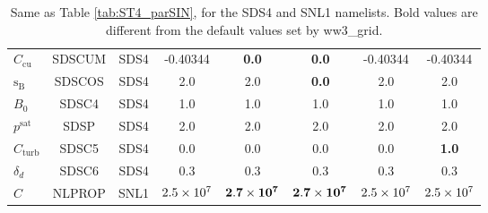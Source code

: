 \begin{landscape}
\begin{table}
\begin{center}
\begin{tabular}{|l|c|c|c|c|c|c|c|}
  $C_{\mathrm{cu}}$                & SDSCUM        & SDS4      & -0.40344    & \textbf{0.0}              & \textbf{0.0}     &-0.40344      &-0.40344   \\
  ${\mathrm{s_B}}$                 & SDSCOS        &SDS4       & 2.0         &  2.0                      & \textbf{0.0}     & 2.0          & 2.0 \\
   $B_0$                           & SDSC4         & SDS4      & 1.0         & 1.0                       & 1.0              & 1.0          & 1.0    \\
  $p^{\mathrm{sat}}$               & SDSP          & SDS4      & 2.0         & 2.0                       & 2.0              & 2.0          & 2.0  \\
  $C_{\mathrm{turb}}$              & SDSC5         & SDS4      & 0.0         & 0.0                       &  0.0             & 0.0          & \textbf{1.0} \\
  $\delta_d$                       & SDSC6         & SDS4      & 0.3         & 0.3                       &  0.3             & 0.3          &0.3   \\
  $C$                              & NLPROP        & SNL1      & $2.5\times 10^7$   & $\mathbf{2.7\times 10^7}$        &$\mathbf{2.7\times 10^7}$& $2.5\times 10^7$    & $2.5\times 10^7$  \\
 \hline \hline
\end{tabular}  \end{center}

\caption{Same as Table \ref{tab:ST4_parSIN}, for the {\F SDS4} and {\F SNL1}
namelists. Bold values are different from the default values set by 
 ww3\_grid.} \label{tab:ST4_parSDS}
\end{table}
\end{landscape}
